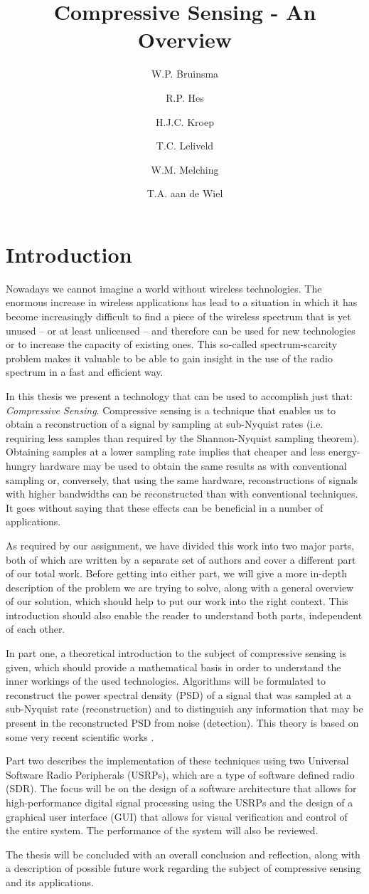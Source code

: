 \documentclass[a4paper, openany, oneside]{memoir}
\title{Compressive Sensing - An Overview}
\author{W.P. Bruinsma \and R.P. Hes \and H.J.C. Kroep \and T.C. Leliveld \and W.M. Melching \and T.A. aan de Wiel}
\begin{document}
\chapter{Introduction}
Nowadays we cannot imagine a world without wireless technologies. The enormous increase in wireless applications has lead to a situation in which it has become increasingly difficult to find a piece of the wireless spectrum that is yet unused -- or at least unlicensed -- and therefore can be used for new technologies or to increase the capacity of existing ones. This so-called spectrum-scarcity problem makes it valuable to be able to gain insight in the use of the radio spectrum in a fast and efficient way.

In this thesis we present a technology that can be used to accomplish just that: \emph{Compressive Sensing}. Compressive sensing is a technique that enables us to obtain a reconstruction of a signal by sampling at sub-Nyquist rates (i.e. requiring less samples than required by the Shannon-Nyquist sampling theorem). Obtaining samples at a lower sampling rate implies that cheaper and less energy-hungry hardware may be used to obtain the same results as with conventional sampling or, conversely, that using the same hardware, reconstructions of signals with higher bandwidths can be reconstructed than with conventional techniques. It goes without saying that these effects can be beneficial in a number of applications.

As required by our assignment, we have divided this work into two major parts, both of which are written by a separate set of authors and cover a different part of our total work. Before getting into either part, we will give a more in-depth description of the problem we are trying to solve, along with a general overview of our solution, which should help to put our work into the right context. This introduction should also enable the reader to understand both parts, independent of each other.

In part one, a theoretical introduction to the subject of compressive sensing is given, which should provide a mathematical basis in order to understand the inner workings of the used technologies. Algorithms will be formulated to reconstruct the power spectral density (PSD) of a signal that was sampled at a sub-Nyquist rate (reconstruction) and to distinguish any information that may be present in the reconstructed PSD from noise (detection). This theory is based on some very recent scientific works \cite{ariananda2011multicoset, ariananda2012compressive}.

Part two describes the implementation of these techniques using two Universal Software Radio Peripherals (USRPs), which are a type of software defined radio (SDR). The focus will be on the design of a software architecture that allows for high-performance digital signal processing using the USRPs and the design of a graphical user interface (GUI) that allows for visual verification and control of the entire system. The performance of the system will also be reviewed.

The thesis will be concluded with an overall conclusion and reflection, along with a description of possible future work regarding the subject of compressive sensing and its applications.
\end{document}
